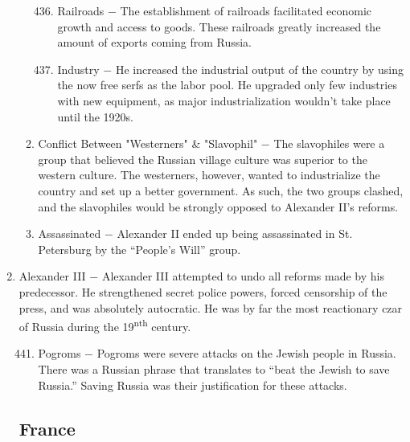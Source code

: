 \documentclass[12pt]{article}
\begin{document}
\begin{enumerate}
\begin{enumerate}[label=\arabic{*}.]
\begin{enumerate}[label=\arabic{*}.]
\setcounter{enumiii}{435}

\item Railroads $-$ The establishment of railroads facilitated economic growth and access to goods. These railroads greatly increased the amount of exports coming from Russia.

\item Industry $-$ He increased the industrial output of the country by using the now free serfs as the labor pool. He upgraded only few industries with new equipment, as major industrialization wouldn't take place until the 1920s.

\end{enumerate}
\setcounter{enumii}{437}

\item Conflict Between "Westerners" \& "Slavophil" $-$ The slavophiles were a group that believed the Russian village culture was superior to the western culture. The westerners, however, wanted to industrialize the country and set up a better government. As such, the two groups clashed, and the slavophiles would be strongly opposed to Alexander II's reforms.

\item Assassinated $-$ Alexander II ended up being assassinated in St. Petersburg by the ``People's Will'' group.

\end{enumerate}
\setcounter{enumi}{439}

\item Alexander III $-$ Alexander III attempted to undo all reforms made by his predecessor. He strengthened secret police powers, forced censorship of the press, and was absolutely autocratic. He was by far the most reactionary czar of Russia during the 19\textsuperscript{nth} century.


\begin{enumerate}[label=\arabic{*}.]
\setcounter{enumii}{440}

\item Pogroms $-$ Pogroms were severe attacks on the Jewish people in Russia. There was a Russian phrase that translates to ``beat the Jewish to save Russia.'' Saving Russia was their justification for these attacks.

\end{enumerate}
\setcounter{enumi}{441}

\subsection{France}


\end{enumerate}
\end{document}
